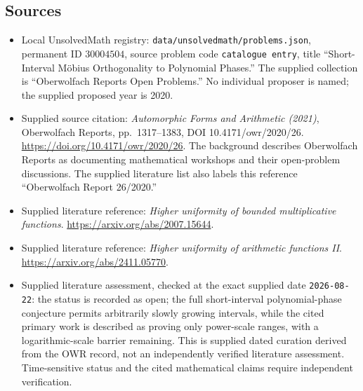\documentclass[11pt]{article}
\begin{document}
\subsection{Sources}
\begin{itemize}
\item Local UnsolvedMath registry: \texttt{data/unsolvedmath/problems.json}, permanent ID \(30004504\), source problem code \texttt{catalogue entry}, title ``Short-Interval Möbius Orthogonality to Polynomial Phases.'' The supplied collection is ``Oberwolfach Reports Open Problems.'' No individual proposer is named; the supplied proposed year is 2020.
\item Supplied source citation: \emph{Automorphic Forms and Arithmetic (2021)}, Oberwolfach Reports, pp.\ 1317--1383, DOI 10.4171/owr/2020/26. \url{https://doi.org/10.4171/owr/2020/26}. The background describes Oberwolfach Reports as documenting mathematical workshops and their open-problem discussions. The supplied literature list also labels this reference ``Oberwolfach Report 26/2020.''
\item Supplied literature reference: \emph{Higher uniformity of bounded multiplicative functions}. \url{https://arxiv.org/abs/2007.15644}.
\item Supplied literature reference: \emph{Higher uniformity of arithmetic functions II}. \url{https://arxiv.org/abs/2411.05770}.
\item Supplied literature assessment, checked at the exact supplied date \texttt{2026-08-22}: the status is recorded as open; the full short-interval polynomial-phase conjecture permits arbitrarily slowly growing intervals, while the cited primary work is described as proving only power-scale ranges, with a logarithmic-scale barrier remaining. This is supplied dated curation derived from the OWR record, not an independently verified literature assessment. Time-sensitive status and the cited mathematical claims require independent verification.
\end{itemize}
\end{document}
